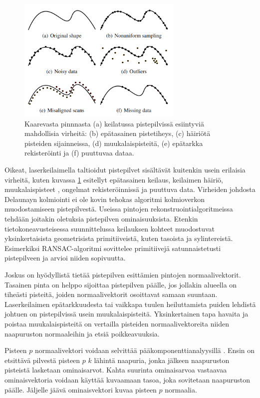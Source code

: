 \begin{figure}
    \centering
    \includegraphics[width=0.7\textwidth]{img/artifacts.png}
    \caption{Kaarevasta pinnnasta (a) keilatussa pistepilvissä esiintyviä mahdollisia virheitä: (b) epätasainen pistetiheys, (c) häiriötä pisteiden sijainneissa, (d) muukalaispisteitä, (e) epätarkka rekisteröinti ja (f) puuttuvaa dataa. \cite{berger}}
    \label{img:artifacts}
\end{figure}

Oikeat, laserkeilaimella taltioidut pistepilvet sisältävät kuitenkin usein erilaisia virheitä, kuten kuvassa \ref{img:artifacts} esitellyt epätasainen keilaus, keilaimen häiriö, muukalaispisteet , ongelmat rekisteröinnissä ja puuttuva data. Virheiden johdosta Delaunayn kolmiointi ei ole kovin tehokas algoritmi kolmioverkon muodostamiseen pistepilvestä. Useissa pintojen rekonstruointialgoritmeissa tehdään joitakin oletuksia pistepilven ominaisuuksista. Etenkin tietokoneavusteisessa suunnittelussa keilauksen kohteet muodostuvat yksinkertaisista geometrisista primitiiveistä, kuten tasoista ja sylintereistä. Esimerkiksi RANSAC-algoritmi \cite{ransac} sovittelee primitiivejä satunnaistetusti pistepilveen ja arvioi niiden sopivuutta. \cite{berger} 

Joskus on hyödyllistä tietää pistepilven esittämien pintojen normaalivektorit. Tasainen pinta on helppo sijoittaa pistepilven päälle, jos jollakin alueella on tiheästi pisteitä, joiden normaalivektorit osoittavat samaan suuntaan. Laserkeilaimen epätarkkuudesta tai vaikkapa tuulen heiluttamista puiden lehdistä johtuen on pistepilvissä usein muukalaispisteitä. Yksinkertainen tapa havaita ja poistaa muukalaispisteitä on vertailla pisteiden normaalivektoreita niiden naapuruston normaaleihin ja etsiä poikkeavuuksia. 

Pisteen $p$ normaalivektori voidaan selvittää pääkomponenttianalyysillä . Ensin on etsittävä pilvestä pisteen $p$ $k$ lähintä naapuria, jonka jälkeen naapuruston pisteistä lasketaan ominaisarvot. Kahta suurinta ominaisarvoa vastaavaa ominaisvektoria voidaan käyttää kuvaamaan tasoa, joka sovitetaan naapuruston päälle. Jäljelle jäävä ominaisvektori kuvaa pisteen $p$ normaalia. \cite{huang}


